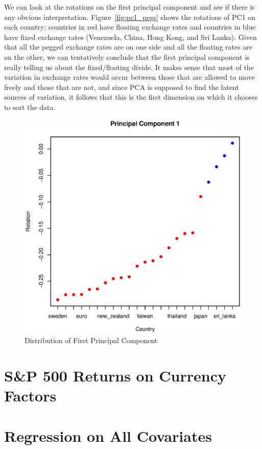 \documentclass[11pt, fleqn]{article}
\begin{document}
We can look at the rotations on the first principal component and see if there is any obvious interpretation. Figure~\vref{fig:pc1_pegs} shows the rotations of PC1 on each country; countries in red have floating exchange rates and countries in blue have fixed exchange rates (Venezuela, China, Hong Kong, and Sri Lanka). Given that all the pegged exchange rates are on one side and all the floating rates are on the other, we can tentatively conclude that the first principal component is really telling us about the fixed/floating divide. It makes sense that most of the variation in exchange rates would occur between those that are allowed to move freely and those that are not, and since PCA is supposed to find the latent sources of variation, it follows that this is the first dimension on which it chooses to sort the data.

\begin{figure}[!htb]
  \centering
  \includegraphics[scale=.5]{pc1_pegs.eps}
  \caption{Distribution of First Principal Component}
  \label{fig:pc1_pegs}
\end{figure} 

\section{S\&P 500 Returns on Currency Factors} \label{sec:sp500}

\section{Regression on All Covariates} \label{sec:regall}
\end{document}
